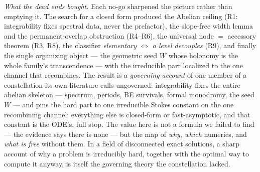 \documentclass[aps,prd,reprint,nofootinbib]{revtex4-2}
\begin{document}
\emph{What the dead ends bought.} Each no-go sharpened the picture rather than emptying it. The search for
a closed form produced the Abelian ceiling (R1: integrability fixes spectral data, never the prefactor),
the slope-free width lemma and the permanent-overlap obstruction (R4--R6), the universal node $=$ accessory
theorem (R3, R8), the classifier \emph{elementary $\Leftrightarrow$ a level decouples} (R9), and finally
the single organizing object --- the geometric seed $W$ whose holonomy is the whole family's transcendence
--- with the irreducible part localized to the one channel that recombines. The result is a \emph{governing
account} of one member of a constellation its own literature calls ungoverned: integrability fixes the
entire abelian skeleton --- spectrum, periods, BE survivals, formal monodromy, the seed $W$ --- and pins
the hard part to one irreducible Stokes constant on the one recombining channel; everything else is
closed-form or fast-asymptotic, and that constant is the ODE's, full stop. The value here is not a formula
we failed to find --- the evidence says there is none --- but the map of \emph{why}, \emph{which} numerics, and
\emph{what is free} without them. In a field of disconnected exact solutions, a sharp account of why a
problem is irreducibly hard, together with the optimal way to compute it anyway, is itself the governing
theory the constellation lacked.
\end{document}
